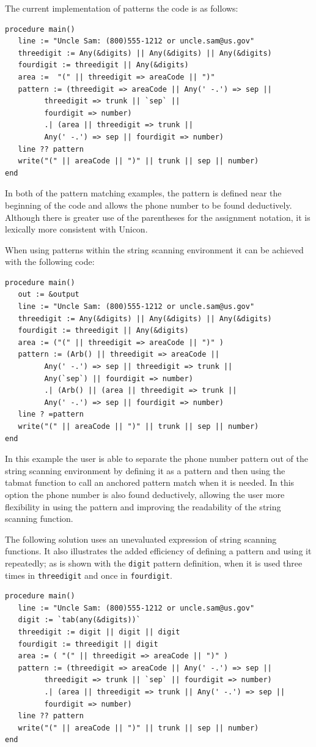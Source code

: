 \documentclass{article}
\begin{document}
The current implementation of patterns the code is as follows:
\begin{verbatim}
procedure main()
   line := "Uncle Sam: (800)555-1212 or uncle.sam@us.gov"
   threedigit := Any(&digits) || Any(&digits) || Any(&digits)
   fourdigit := threedigit || Any(&digits)
   area :=  "(" || threedigit => areaCode || ")" 
   pattern := (threedigit => areaCode || Any(' -.') => sep || 
         threedigit => trunk || `sep` || 
         fourdigit => number) 
         .| (area || threedigit => trunk || 
         Any(' -.') => sep || fourdigit => number)
   line ?? pattern
   write("(" || areaCode || ")" || trunk || sep || number) 
end
\end{verbatim}
In both of the pattern matching examples, the pattern is defined near the beginning of the code and allows the phone number to be found deductively. Although there is greater use of the parentheses for the assignment notation, it is lexically more consistent with Unicon. 

When using patterns within the string scanning environment it can be achieved with the following code:
\begin{verbatim}
procedure main()
   out := &output
   line := "Uncle Sam: (800)555-1212 or uncle.sam@us.gov"
   threedigit := Any(&digits) || Any(&digits) || Any(&digits)
   fourdigit := threedigit || Any(&digits)
   area := ("(" || threedigit => areaCode || ")" )
   pattern := (Arb() || threedigit => areaCode || 
         Any(' -.') => sep || threedigit => trunk || 
         Any(`sep`) || fourdigit => number) 
         .| (Arb() || (area || threedigit => trunk || 
         Any(' -.') => sep || fourdigit => number)
   line ? =pattern 
   write("(" || areaCode || ")" || trunk || sep || number)
end
\end{verbatim}
In this example the user is able to separate the phone number pattern out of the string scanning environment by defining it as a pattern and then using the tabmat function to call an anchored pattern match when it is needed.  In this option the phone number is also found deductively, allowing the user more flexibility in using the pattern and improving the readability of the string scanning function.

The following solution uses an unevaluated expression of string scanning functions.  It also illustrates the added efficiency of defining a pattern and using it repeatedly; as is shown with the \texttt{digit} pattern definition, when it is used three times in \texttt{threedigit} and once in \texttt{fourdigit}. 
\begin{verbatim}
procedure main()
   line := "Uncle Sam: (800)555-1212 or uncle.sam@us.gov"
   digit := `tab(any(&digits))`
   threedigit := digit || digit || digit
   fourdigit := threedigit || digit
   area := ( "(" || threedigit => areaCode || ")" )
   pattern := (threedigit => areaCode || Any(' -.') => sep ||
         threedigit => trunk || `sep` || fourdigit => number) 
         .| (area || threedigit => trunk || Any(' -.') => sep ||
         fourdigit => number)
   line ?? pattern
   write("(" || areaCode || ")" || trunk || sep || number) 
end
\end{verbatim}
\end{document}

